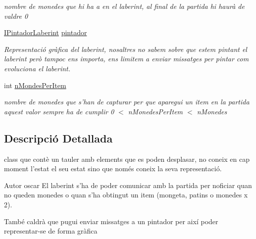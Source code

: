 \begin{DoxyCompactItemize}
\begin{DoxyCompactList}\small\item\em nombre de monedes que hi ha a en el laberint, al final de la partida hi haurà de valdre 0 \end{DoxyCompactList}\item 
\hypertarget{classlogica_1_1laberints_1_1_laberint_a4073632c1d1ab02ede9cddc2bbb6da2f}{\hyperlink{interfaceinterficie_1_1_i_pintador_laberint}{I\+Pintador\+Laberint} \hyperlink{classlogica_1_1laberints_1_1_laberint_a4073632c1d1ab02ede9cddc2bbb6da2f}{pintador}}\label{classlogica_1_1laberints_1_1_laberint_a4073632c1d1ab02ede9cddc2bbb6da2f}

\begin{DoxyCompactList}\small\item\em Representació gràfica del laberint, nosaltres no sabem sobre que estem pintant el laberint però tampoc ens importa, ens limitem a enviar missatges per pintar com evoluciona el laberint. \end{DoxyCompactList}\item 
\hypertarget{classlogica_1_1laberints_1_1_laberint_a65b89b5e73ed4533df3a8c2296e492be}{int \hyperlink{classlogica_1_1laberints_1_1_laberint_a65b89b5e73ed4533df3a8c2296e492be}{n\+Mondes\+Per\+Item}}\label{classlogica_1_1laberints_1_1_laberint_a65b89b5e73ed4533df3a8c2296e492be}

\begin{DoxyCompactList}\small\item\em nombre de monedes que s'han de capturar per que aparegui un item en la partida aquest valor sempre ha de cumplir 0 $<$ n\+Monedes\+Per\+Item $<$ n\+Monedes \end{DoxyCompactList}\end{DoxyCompactItemize}


\subsection{Descripció Detallada}
class que contè un tauler amb elements que es poden desplasar, no coneix en cap moment l'estat el seu estat sino que només coneix la seva representació. 

\begin{DoxyAuthor}{Autor}
oscar El laberint s'ha de poder comunicar amb la partida per noficiar quan no queden monedes o quan s'ha obtingut un item (mongeta, patins o monedes x 2).
\end{DoxyAuthor}
També caldrà que pugui enviar missatges a un pintador per així poder representar-\/se de forma gràfica 

